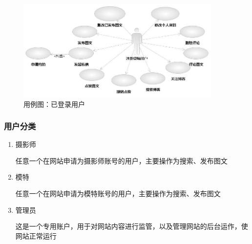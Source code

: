 \documentclass[a4paper,14pt]{ctexart}
\begin{document}
\begin{figure}[H]
\centering\includegraphics[width=4in]{用例图-用户.jpeg}
\caption{用例图：已登录用户}
\label{fig:3}
\end{figure}

\subsubsection{用户分类}
\begin{enumerate}[1)]
\item 摄影师\par
任意一个在网站申请为摄影师账号的用户，主要操作为搜索、发布图文
\item 模特\par
任意一个在网站申请为模特账号的用户，主要操作为搜索、发布图文
\item 管理员\par
这是一个专用账户，用于对网站内容进行监管，以及管理网站的后台运作，使网站正常运行
\end{enumerate}
\end{document}
